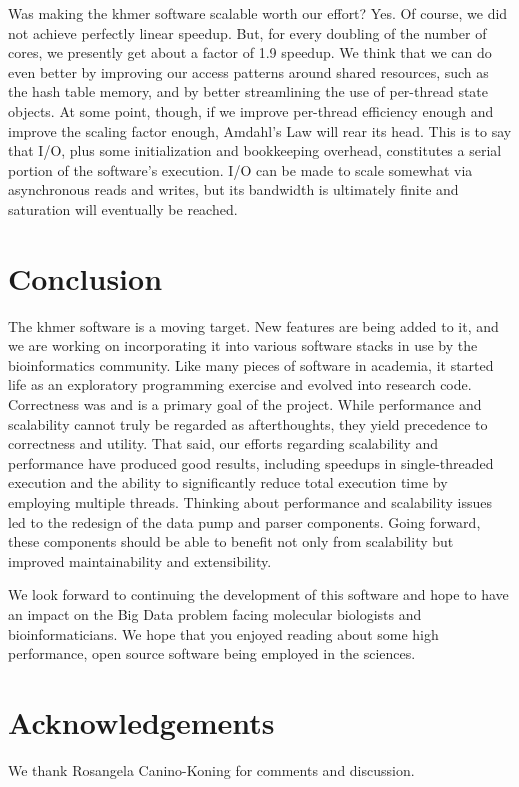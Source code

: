 \documentclass{article}
\begin{document}
Was making the khmer software scalable worth our effort? Yes. Of course, we did
not achieve perfectly linear speedup. But, for every doubling of the number of
cores, we presently get about a factor of 1.9 speedup. We think that we can do
even better by improving our access patterns around shared resources, such as
the hash table memory, and by better streamlining the use of per-thread state
objects. At some point, though, if we improve per-thread efficiency enough and
improve the scaling factor enough, Amdahl's Law \citep{web:Amdahl} will rear
its head. This is to say that I/O, plus some initialization and bookkeeping
overhead, constitutes a serial portion of the software's execution. I/O can be
made to scale somewhat via asynchronous reads and writes, but its bandwidth is
ultimately finite and saturation will eventually be reached.


\section{Conclusion}

The khmer software is a moving target. New features are being added to it, and
we are working on incorporating it into various software stacks in use by the
bioinformatics community. Like many pieces of software in academia, it started
life as an exploratory programming exercise and evolved into research code.
Correctness was and is a primary goal of the project. While performance and
scalability cannot truly be regarded as afterthoughts, they yield precedence to
correctness and utility. That said, our efforts regarding scalability and
performance have produced good results, including speedups in single-threaded
execution and the ability to significantly reduce total execution time by
employing multiple threads. Thinking about performance and scalability issues
led to the redesign of the data pump and parser components. Going forward,
these components should be able to benefit not only from scalability but
improved maintainability and extensibility.

We look forward to continuing the development of this software and hope to have
an impact on the Big Data problem facing molecular biologists and
bioinformaticians. We hope that you enjoyed reading about some high
performance, open source software being employed in the sciences.

\section{Acknowledgements}

We thank Rosangela Canino-Koning for comments and discussion.



\end{document}
